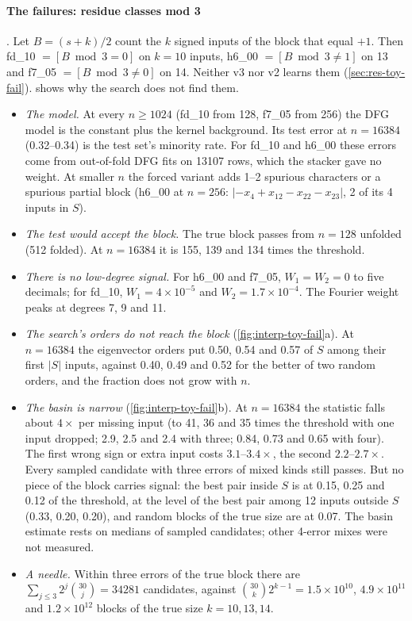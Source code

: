\paragraph{The failures: residue classes mod 3} . Let $B=(s+k)/2$ count the $k$ signed inputs of the block that equal $+1$. Then fd\_10 $=[B\bmod3=0]$ on $k=10$ inputs, h6\_00 $=[B\bmod3\ne1]$ on 13 and f7\_05 $=[B\bmod3\ne0]$ on 14. Neither v3 nor v2 learns them (\cref{sec:res-toy-fail}).  shows why the search does not find them.
\begin{itemize}
\item \emph{The model.} At every $n\ge1024$ (fd\_10 from 128, f7\_05 from 256) the DFG model is the constant plus the kernel background. Its test error at $n=16384$ (0.32--0.34) is the test set's minority rate. For fd\_10 and h6\_00 these errors come from out-of-fold DFG fits on 13107 rows, which the stacker gave no weight. At smaller $n$ the forced variant adds 1--2 spurious characters or a spurious partial block (h6\_00 at $n=256$: $|-x_4+x_{12}-x_{22}-x_{23}|$, 2 of its 4 inputs in $S$).
\item \emph{The test would accept the block.} The true block passes from $n=128$ unfolded (512 folded). At $n=16384$ it is 155, 139 and 134 times the threshold.
\item \emph{There is no low-degree signal.} For h6\_00 and f7\_05, $W_1=W_2=0$ to five decimals; for fd\_10, $W_1=4\times10^{-5}$ and $W_2=1.7\times10^{-4}$. The Fourier weight peaks at degrees 7, 9 and 11.
\item \emph{The search's orders do not reach the block} (\cref{fig:interp-toy-fail}a). At $n=16384$ the eigenvector orders put 0.50, 0.54 and 0.57 of $S$ among their first $|S|$ inputs, against 0.40, 0.49 and 0.52 for the better of two random orders, and the fraction does not grow with $n$.
\item \emph{The basin is narrow} (\cref{fig:interp-toy-fail}b). At $n=16384$ the statistic falls about $4\times$ per missing input (to 41, 36 and 35 times the threshold with one input dropped; 2.9, 2.5 and 2.4 with three; 0.84, 0.73 and 0.65 with four). The first wrong sign or extra input costs $3.1$--$3.4\times$, the second $2.2$--$2.7\times$. Every sampled candidate with three errors of mixed kinds still passes. But no piece of the block carries signal: the best pair inside $S$ is at 0.15, 0.25 and 0.12 of the threshold, at the level of the best pair among 12 inputs outside $S$ (0.33, 0.20, 0.20), and random blocks of the true size are at 0.07. The basin estimate rests on medians of sampled candidates; other 4-error mixes were not measured.
\item \emph{A needle.} Within three errors of the true block there are $\sum_{j\le3}2^j\binom{30}{j}=34281$ candidates, against $\binom{30}{k}2^{k-1}=1.5\times10^{10}$, $4.9\times10^{11}$ and $1.2\times10^{12}$ blocks of the true size $k=10,13,14$.
\end{itemize}
